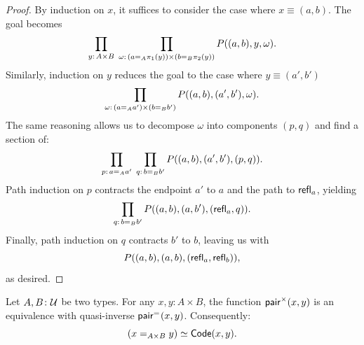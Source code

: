\begin{proof}
    By induction on $x$, it suffices to consider the case where $x\equiv(a,b)$. The goal becomes
    \[
        \prod_{y\colon A\times B}\;
        \prod_{\omega\colon(a\eq A\pi_1(y))
        \times(b\eq B\pi_2(y))}
        P((a,b),y,\omega).
    \]
    Similarly, induction on $y$ reduces the goal to the case where $y\equiv(a',b')$
    \[
        \prod_{\omega\colon(a\eq Aa')
        \times(b\eq Bb')}
        P((a,b),(a',b'),\omega).
    \]
    The same reasoning allows us to decompose $\omega$ into components $(p,q)$ and find a section of:
    \[
        \prod_{p\colon a\eq Aa'}\;\prod_{q\colon b\eq Bb'}
        P((a,b),(a',b'),(p,q)).
    \]
    Path induction on $p$ contracts the endpoint $a'$ to $a$ and the path to $\mathsf{refl}_a$, yielding
    \[
        \prod_{q\colon b\eq Bb'}P((a,b),(a,b'),(\fun{refl}_a,q)).
    \]
    Finally, path induction on $q$ contracts $b'$ to $b$, leaving us with
    \[
        P((a,b),(a,b),(\mathsf{refl}_a,\mathsf{refl}_b)),
    \]
    as desired.
\end{proof}


\begin{thm}
    Let\/ $A,B\colon\univ$ be two types. For any\/ $x,y\colon A\times B$, the function\/ $\mathsf{pair}^\times(x,y)$ is an equivalence with quasi-inverse\/ $\mathsf{pair}^{\mathrel{=_{}}}(x,y)$. Consequently:
    \[
        (x\mathrel{=_{A\times B}}y)\simeq\mathsf{Code}(x,y).
    \]
\end{thm}

